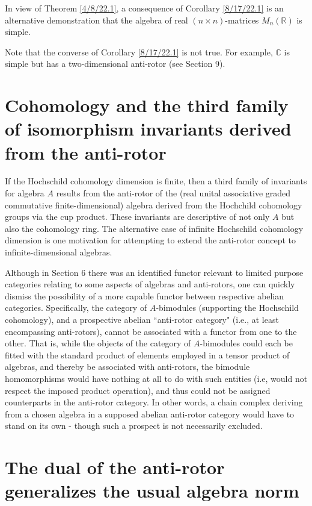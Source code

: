 \documentclass{amsart}
\numberwithin{equation}{section}
\theoremstyle{definition}
\numberwithin{theorem}{section}
\begin{document}
In view of Theorem \ref{4/8/22.1}, a consequence of Corollary \ref{8/17/22.1} is an alternative demonstration that the algebra of real $(n\times n)$-matrices $ M_n(\mathbb{R})$ is simple.  

Note that the converse of Corollary \ref{8/17/22.1} is not true.  For example, $\mathbb{C}$ is simple but has a two-dimensional anti-rotor (see Section 9). 

\section{Cohomology and the third family of isomorphism invariants derived from the anti-rotor} 
If the Hochschild cohomology dimension is finite, then a third family of invariants for algebra $A$ results from the anti-rotor of the (real unital associative graded commutative finite-dimensional) algebra derived from the Hochchild \mbox{cohomology} groups via the cup product.  These invariants are descriptive of not only $A$ but also the cohomology ring.  The alternative case of infinite Hochschild cohomology dimension is one motivation for attempting to extend the anti-rotor concept to infinite-dimensional algebras. 


Although in Section 6 there was an identified functor relevant to limited purpose categories relating to some aspects of algebras and anti-rotors, one can quickly dismiss the possibility of a more capable functor between respective abelian categories.  Specifically, the category of $A$-bimodules (supporting the Hochschild cohomology), and a prospective abelian ``anti-rotor category" (i.e., at least encompassing anti-rotors), cannot be associated with a functor from one to the other.  That is, while the objects of the category of $A$-bimodules could each be fitted with the standard product of elements employed in a tensor product of algebras, and thereby be associated with anti-rotors, the bimodule homomorphisms would have nothing at all to do with such entities (i.e, would not respect the imposed product operation), and thus could not be assigned counterparts in the anti-rotor category.  In other words, a chain complex deriving from a chosen algebra in a supposed abelian anti-rotor category would have to stand on its own - though such a prospect is not necessarily excluded.

\section{The dual of the anti-rotor generalizes the usual algebra norm} 
\end{document}
